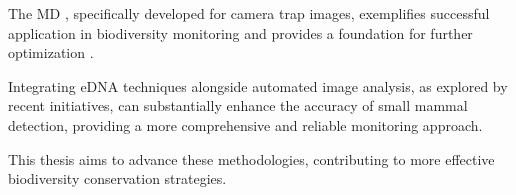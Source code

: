 The \ac{MD} \autocite{morrisEfficientPipelineCamera2025}, specifically developed for camera trap images, exemplifies successful application in biodiversity monitoring and provides a foundation for further optimization \autocite{hernandezPytorchWildlifeCollaborativeDeep2024, velezChoosingAppropriatePlatform2022, schneiderRecognitionEuropeanMammals2024}.




Integrating \ac{eDNA} techniques alongside automated image analysis, as explored by recent initiatives, can substantially enhance the accuracy of small mammal detection, providing a more comprehensive and reliable monitoring approach.

This thesis aims to advance these methodologies, contributing to more effective biodiversity conservation strategies.
